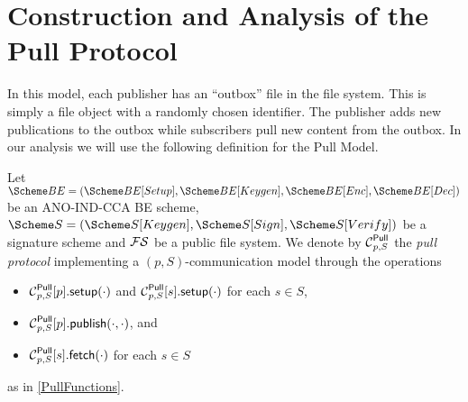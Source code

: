\section{Construction and Analysis of the Pull Protocol}
\label{PullAnalysis}

In this model, each publisher has an \enquote{outbox} file in the file system.
This is simply a file object with a randomly chosen identifier.
The publisher adds new publications to the outbox while subscribers pull new 
content from the outbox.
In our analysis we will use the following definition for the Pull Model.

\begin{definition}\label{PullModel}
  Let \(\BE = (\BE[Setup], \BE[Keygen], \BE[Enc], \BE[Dec])\) be an ANO-IND-CCA 
  \ac{BE} scheme,
  \(\S = (\S[Keygen], \S[Sign], \S[Verify])\) be a signature scheme and \(\FS\) 
  be a public file system.
  We denote by \(\Pull[p, S]\) the \emph{pull protocol} implementing a \((p, 
    S)\)-communication model through the operations
  \begin{itemize}
    \item \(\psetup[p, S]{p}[\cdot]\) and \(\psetup[p, S]{s}[\cdot]\) for each
      \(s\in S\),
    \item \(\ppub[p, S]{p}[\cdot][\cdot]\), and
    \item \(\pget[p, S]{s}[\cdot]\) for each \(s\in S\)
  \end{itemize}
  as in \cref{PullFunctions}.
\end{definition}

